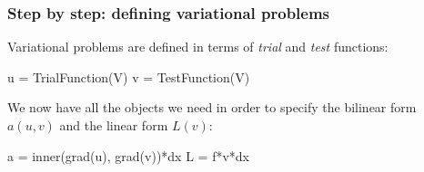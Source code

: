 \begin{frame}[fragile]
  \frametitle{Step by step: defining variational problems}

  Variational problems are defined in terms of \emph{trial} and
  \emph{test} functions:
  \begin{python}
u = TrialFunction(V)
v = TestFunction(V)
  \end{python}

  \bigskip

  We now have all the objects we need in order to specify the bilinear
  form $a(u,v)$ and the linear form $L(v)$:
  \begin{python}
a = inner(grad(u), grad(v))*dx
L = f*v*dx
  \end{python}

\end{frame}
